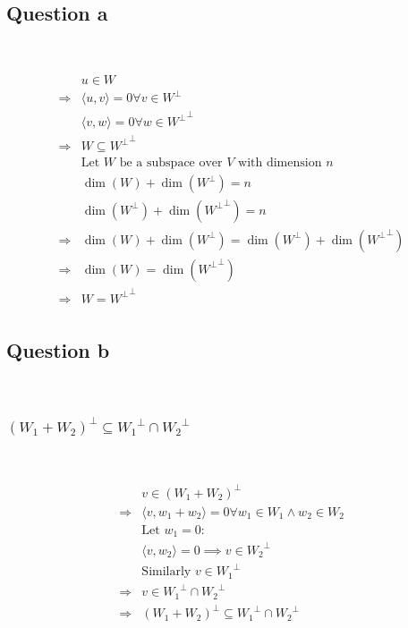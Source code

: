 \documentclass{article}
\begin{document}
\subsection{Question a}

~

\begin{equation*}
    \begin{split}
        &u\in W\\
        \Rightarrow&\langle u,v\rangle=0\forall v\in W^\perp\\
        &\langle v, w\rangle=0\forall w\in{W^\perp}^\perp\\
        \Rightarrow&W\subseteq {W^\perp}^\perp\\
        &\text{Let }W \text{ be a subspace over }V \text{ with dimension }n\\
        &\dim(W)+\dim(W^\perp)=n\\
        &\dim(W^\perp)+\dim({W^\perp}^\perp)=n\\
        \Rightarrow&\dim(W)+\dim(W^\perp)=\dim(W^\perp)+\dim({W^\perp}^\perp)\\
        \Rightarrow&\dim(W)=\dim({W^\perp}^\perp)\\
        \Rightarrow&W={W^\perp}^\perp\\
    \end{split}
\end{equation*}

\subsection{Question b}

~

\subsubsection*{$(W_1+W_2)^\perp\subseteq {W_1}^\perp\cap {W_2}^\perp$}

~

\begin{equation*}
    \begin{split}
        &v\in (W_1+W_2)^\perp\\
        \Rightarrow&\langle v,w_1+w_2\rangle=0\forall w_1\in W_1\land w_2\in W_2\\
        &\text{Let } w_1=0:\\
        &\langle v,w_2\rangle=0\implies v\in {W_2}^\perp\\
        &\text{Similarly } v\in {W_1}^\perp\\
        \Rightarrow&v\in{W_1}^\perp\cap {W_2}^\perp\\
        \Rightarrow&(W_1+W_2)^\perp\subseteq {W_1}^\perp\cap {W_2}^\perp\\
    \end{split}
\end{equation*}
\end{document}
